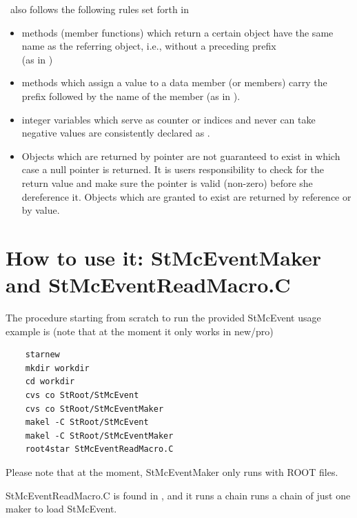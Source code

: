 \StMcEvent\ also follows the following rules set forth in \StEvent\ 
\begin{itemize}
\item methods (member functions) which return a certain object have
    the same name as the referring object, i.e., without a preceding
    \name{get} prefix \\ (as in \name{StMcEvent::primary\-Vertex()})
\item methods which assign a value to a data member (or members) carry
    the prefix \name{set} followed by the name of the member (as in ).
\item integer variables which serve as counter or indices and never
    can take negative values are consistently declared as
    .
\item Objects which are returned by pointer are not guaranteed to
    exist in which case a null pointer is returned. It is users
    responsibility to check for the return value and make sure the
    pointer is valid (non-zero) before she dereference it.  Objects
    which are granted to exist are returned by reference or by value.
\end{itemize}


\section{How to use it: StMcEventMaker and StMcEventReadMacro.C}
\label{sec:howto}
The procedure starting from scratch to run the provided StMcEvent usage
example is (note that at the moment it only works in new/pro)
\begin{verbatim}
    starnew
    mkdir workdir
    cd workdir
    cvs co StRoot/StMcEvent
    cvs co StRoot/StMcEventMaker
    makel -C StRoot/StMcEvent
    makel -C StRoot/StMcEventMaker
    root4star StMcEventReadMacro.C
\end{verbatim}

Please note that at the moment, StMcEventMaker only runs with ROOT files.

StMcEventReadMacro.C is found in
,  %
and it runs a chain runs a
chain of just one maker to load StMcEvent.




